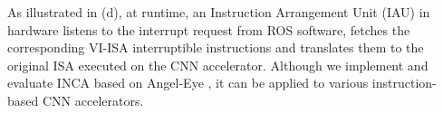 As illustrated in (d), at runtime, an Instruction Arrangement Unit (IAU) in hardware listens to the interrupt request from ROS software, fetches the corresponding VI-ISA interruptible instructions and translates them to the original ISA executed on the CNN accelerator. 
Although we implement and evaluate INCA based on Angel-Eye \cite{guo2017angel}, it can be applied to various instruction-based CNN accelerators.


